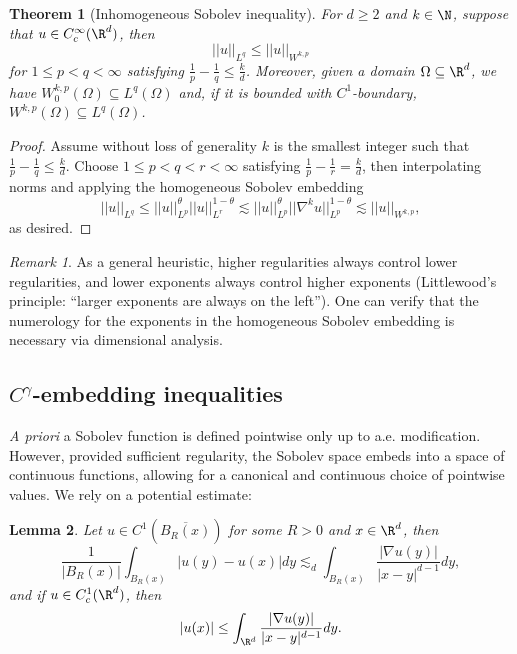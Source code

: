 \documentclass[reqno]{amsart}
\newtheorem{theorem}{Theorem}
\newtheorem{lemma}[theorem]{Lemma}
\theoremstyle{definition}
\theoremstyle{remark}
\newtheorem*{remark}{Remark}
\begin{document}
\begin{theorem}[Inhomogeneous Sobolev inequality]
	For $d \geq 2$ and $k \in \N$, suppose that $u \in C^\infty_c (\R^d)$, then 
		\[ ||u||_{L^q} \leq || u||_{W^{k, p}} \]
	for $1 \leq p < q < \infty$ satisfying $\tfrac{1}{p} - \tfrac{1}{q} \leq \tfrac{k}{d}$. Moreover, given a domain $\Omega \subseteq \R^d$, we have $W^{k, p}_0 (\Omega) \subseteq L^q (\Omega)$ and, if it is bounded with $C^1$-boundary, $W^{k, p} (\Omega) \subseteq L^q (\Omega)$. 
\end{theorem}

\begin{proof}
	Assume without loss of generality $k$ is the smallest integer such that $\tfrac{1}{p} - \tfrac{1}{q} \leq \tfrac{k}{d}$. Choose $1 \leq p < q < r < \infty$ satisfying $\tfrac{1}{p} - \tfrac{1}{r} = \tfrac{k}{d}$, then interpolating norms and applying the homogeneous Sobolev embedding
		\[ ||u||_{L^q} \leq ||u||^\theta_{L^p} ||u||^{1 - \theta}_{L^r} \lesssim ||u||^\theta_{L^p} ||\nabla^k u||_{L^p}^{1 - \theta} \lesssim ||u||_{W^{k, p}}, \]
	as desired. 	
\end{proof}

\begin{remark}
	As a general heuristic, higher regularities always control lower regularities, and lower exponents always control higher exponents (Littlewood's principle: ``larger exponents are always on the left''). One can verify that the numerology for the exponents in the homogeneous Sobolev embedding is necessary via dimensional analysis. 
\end{remark}

\subsection{$C^\gamma$-embedding inequalities}

\textit{A priori} a Sobolev function is defined pointwise only up to a.e. modification. However, provided sufficient regularity, the Sobolev space embeds into a space of continuous functions, allowing for a canonical and continuous choice of pointwise values. We rely on a potential estimate:

\begin{lemma}
	Let $u \in C^1 (\overline{B_R (x)})$ for some $R> 0$ and $x \in \R^d$, then 
		\[ \frac{1}{|B_R (x)|} \int_{B_R (x)} |u(y) - u(x)| dy \lesssim_d \int_{B_R (x)} \frac{|\nabla u (y)|}{|x - y|^{d - 1}} dy, \]
	and if $u \in C^1_c (\R^d)$, then 
		\[ |u(x)| \leq \int_{\R^d} \frac{|\nabla u (y)|}{|x - y|^{d - 1}} dy. \]	
\end{lemma}
\end{document}
